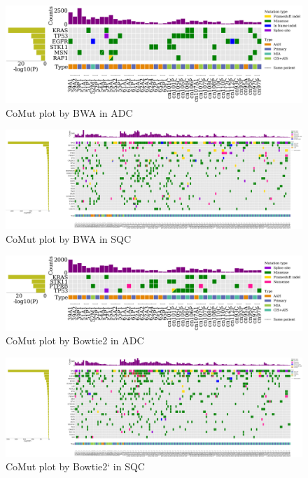 \documentclass[11pt,a4paper,onecolumn,oneside]{report}
\begin{document}
                \begin{figure}[p]
                    \centering
                    \includegraphics[width=\linewidth]{figures/Mutect2/BWA-ADC.pdf}
                    \caption{CoMut plot by BWA in ADC}
                    \label{fig:comut-BWA-ADC}
                \end{figure}

                \begin{figure}[p]
                    \centering
                    \includegraphics[width=\linewidth]{figures/Mutect2/BWA-SQC.pdf}
                    \caption{CoMut plot by BWA in SQC}
                    \label{fig:comut-BWA-SQC}
                \end{figure}

                \begin{figure}[p]
                    \centering
                    \includegraphics[width=\linewidth]{figures/Mutect2/Bowtie2-ADC.pdf}
                    \caption{CoMut plot by Bowtie2 in ADC}
                    \label{fig:comut-Bowtie2-ADC}
                \end{figure}

                \begin{figure}[p]
                    \centering
                    \includegraphics[width=\linewidth]{figures/Mutect2/Bowtie2-SQC.pdf}
                    \caption{CoMut plot by Bowtie2` in SQC}
                    \label{fig:comut-Bowtie2-SQC}
                \end{figure}
\end{document}
